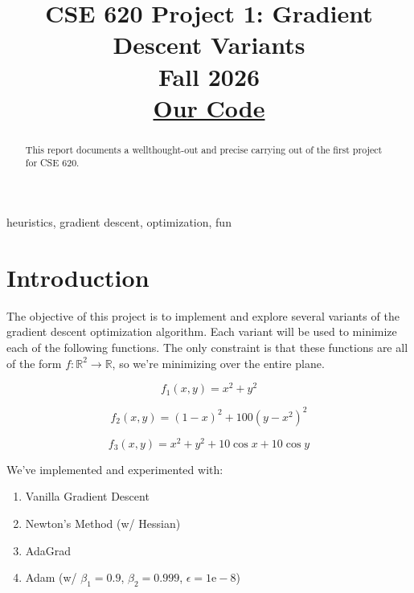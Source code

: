 \documentclass[conference]{IEEEtran}
\begin{document}
\title{
    CSE 620 Project 1: Gradient Descent Variants\\[0.5em]
    \Large Fall 2026\\[0.5em]
    \large \href{https://github.com/rlovett992/CSE_620_Fall26_Project1_Robert_John/tree/main}{Our Code}
}

\author{
    \and
}

\maketitle

\begin{abstract}
This report documents a wellthought-out and precise carrying out of the first project for CSE 620.
\end{abstract}

\begin{IEEEkeywords}
heuristics, gradient descent, optimization, fun
\end{IEEEkeywords}

\section{Introduction}
The objective of this project is to implement and explore several variants of the gradient descent optimization algorithm.
Each variant will be used to minimize each of the following functions. The only
constraint is that these functions are all of the form $f: \mathbb{R}^2 \to \mathbb{R}$,
so we're minimizing over the entire plane.

\begin{equation}
    f_1(x,y) = x^2 + y^2
\end{equation}

\begin{equation}
    f_2(x,y) = (1-x)^2 + 100(y - x^2)^2
\end{equation}

\begin{equation}
    f_3(x,y) = x^2 + y^2 + 10\cos{x} + 10\cos{y}
\end{equation}

We've implemented and experimented with:

\begin{enumerate}
    \item Vanilla Gradient Descent
    \item Newton's Method (w/ Hessian)
    \item AdaGrad
    \item Adam (w/ $\beta_1=0.9$, $\beta_2=0.999$, $\epsilon=1\mathrm{e}-8$)
\end{enumerate}
\end{document}

